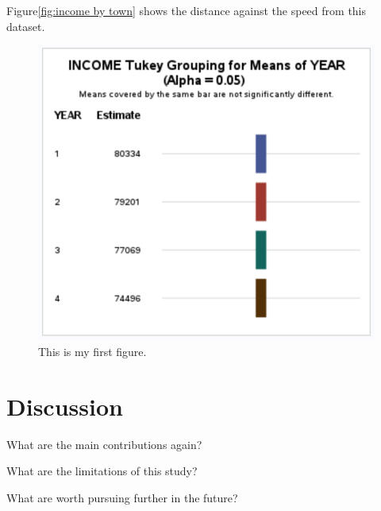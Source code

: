 \documentclass[12pt]{article}
\begin{document}
Figure\ref{fig:income by town} shows the distance against the speed from this dataset.
\begin{figure}[tbp]
  \centering
  \includegraphics[width=\textwidth]{Income by year.pdf}
  \caption{This is my first figure.}\label{fig:cars}
\end{figure}

\section{Discussion}\label{sec:disc}

What are the main contributions again?

What are the limitations of this study?

What are worth pursuing further in the future?


\appendix



\end{document}
